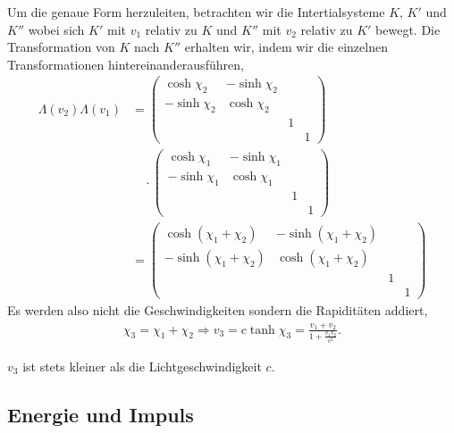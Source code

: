  Um die genaue Form herzuleiten, betrachten wir die
Intertialsysteme $K$, $K'$ und $K''$ wobei sich $K'$ mit $v_1$ relativ zu $K$
und $K''$ mit $v_2$ relativ zu $K'$ bewegt.
Die Transformation von $K$ nach $K''$ erhalten wir, indem wir die einzelnen
Transformationen hintereinanderausführen,
\begin{align*}
\Lambda(v_2)\Lambda(v_1) &= 
\begin{pmatrix}
\cosh\chi_2 & -\sinh\chi_2\\
-\sinh\chi_2 & \cosh\chi_2\\
&& 1\\
&&& 1
\end{pmatrix}\\
&\quad \cdot
\begin{pmatrix}
\cosh\chi_1 & -\sinh\chi_1\\
-\sinh\chi_1 & \cosh\chi_1\\
&& 1\\
&&& 1
\end{pmatrix}\\
&=
\begin{pmatrix}
\cosh(\chi_1+\chi_2) & -\sinh(\chi_1+\chi_2)\\
-\sinh(\chi_1+\chi_2) & \cosh(\chi_1+\chi_2)\\
&& 1\\
&&& 1
\end{pmatrix}
\end{align*}
Es werden also nicht die Geschwindigkeiten sondern die Rapiditäten addiert,
\begin{align*}
\chi_3 = \chi_1+\chi_2\Rightarrow v_3 = c\tanh \chi_3 =
\frac{v_1+v_2}{1+\frac{v_1v_2}{c^2}}.
\end{align*}

\begin{bemn}
$v_3$ ist stets kleiner als die Lichtgeschwindigkeit $c$.\maphere
\end{bemn}

\subsection{Energie und Impuls}

